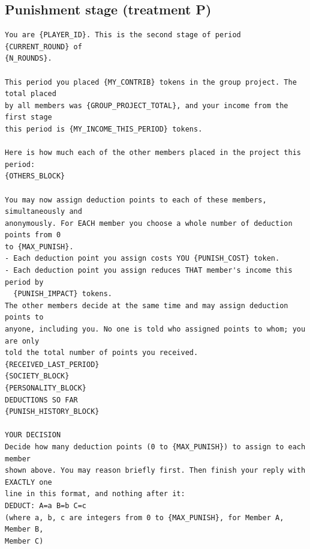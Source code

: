 \documentclass[11pt]{article}
\begin{document}
\subsection*{Punishment stage (treatment P)}
{\footnotesize
\begin{Verbatim}[breaklines=true,breakanywhere=true]
You are {PLAYER_ID}. This is the second stage of period {CURRENT_ROUND} of
{N_ROUNDS}.

This period you placed {MY_CONTRIB} tokens in the group project. The total placed
by all members was {GROUP_PROJECT_TOTAL}, and your income from the first stage
this period is {MY_INCOME_THIS_PERIOD} tokens.

Here is how much each of the other members placed in the project this period:
{OTHERS_BLOCK}

You may now assign deduction points to each of these members, simultaneously and
anonymously. For EACH member you choose a whole number of deduction points from 0
to {MAX_PUNISH}.
- Each deduction point you assign costs YOU {PUNISH_COST} token.
- Each deduction point you assign reduces THAT member's income this period by
  {PUNISH_IMPACT} tokens.
The other members decide at the same time and may assign deduction points to
anyone, including you. No one is told who assigned points to whom; you are only
told the total number of points you received.
{RECEIVED_LAST_PERIOD}
{SOCIETY_BLOCK}
{PERSONALITY_BLOCK}
DEDUCTIONS SO FAR
{PUNISH_HISTORY_BLOCK}

YOUR DECISION
Decide how many deduction points (0 to {MAX_PUNISH}) to assign to each member
shown above. You may reason briefly first. Then finish your reply with EXACTLY one
line in this format, and nothing after it:
DEDUCT: A=a B=b C=c
(where a, b, c are integers from 0 to {MAX_PUNISH}, for Member A, Member B,
Member C)
\end{Verbatim}
}

\clearpage
\printbibliography
\end{document}
